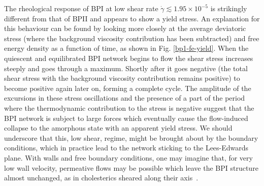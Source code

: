 \documentclass[aps,pre,reprint,superscriptaddress, twocolumn]{revtex4}
\newcommand{\e}[1]{\times10^{#1}}
\newcommand{\gd}{\dot{\gamma}}
\begin{document}
The rheological response of BPI at low shear rate $\gd\lesssim1.95\e{-5}$ 
is strikingly different from that of BPII and appears to show a
yield stress. An explanation for this behaviour can be found by 
looking more closely at the average deviatoric stress (where the
background viscosity contribution has been subtracted) and 
free energy density as a function of time, as shown in Fig. \ref{bp1-fe-yield}.
When the quiescent and equilibrated BPI network begins to flow
the shear stress increases steeply and goes through a maximum.
Shortly after it goes negative (the total shear stress 
with the background viscosity contribution remains positive) 
to become positive again later on, forming a complete cycle.
The amplitude of the excursions in these stress oscillations and
the presence of a part of the period where the thermodynamic
contribution to the stress is negative suggest that the
BPI network is subject to large forces which eventually 
cause the flow-induced collapse to the amorphous state with
an apparent yield stress. We should underscore that this,
low shear, regime, might be brought about by the boundary
conditions, which in practice lead to the network sticking to
the Lees-Edwards plane. With walls and free boundary conditions,
one may imagine that, for very low wall velocity, 
permeative flows may be possible which leave the BPI 
structure almost unchanged, as in cholesterics sheared
along their axis~\cite{Marenduzzo:2006b}.
\end{document}
